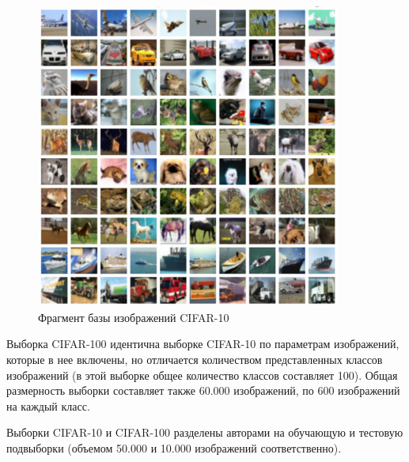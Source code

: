 \begin{figure}[h]
	\begin{center}
		\includegraphics[width=10cm]{man-source/images/ch3/pic3-2.pdf}
		\caption{Фрагмент базы изображений CIFAR-10}				
		\label{fig:cifar_dataset}
	\end{center}
\end{figure}

Выборка CIFAR-100 идентична выборке CIFAR-10 по параметрам изображений, которые в нее включены, но отличается количеством представленных классов изображений (в этой выборке общее количество классов составляет 100). Общая размерность выборки составляет также 60.000 изображений, по 600 изображений на каждый класс.

Выборки CIFAR-10 и CIFAR-100 разделены авторами на обучающую и тестовую подвыборки (объемом 50.000 и 10.000 изображений соответственно).



